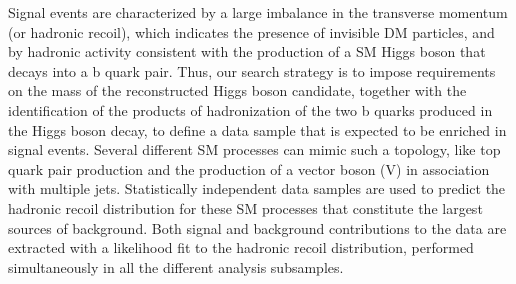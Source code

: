 


Signal events are characterized by a large imbalance in the transverse
momentum (or hadronic recoil), which indicates the presence of invisible
DM particles, and by hadronic activity consistent with the production
of a SM Higgs boson that decays into a b quark pair. Thus, our search
strategy is to impose requirements on the mass of the reconstructed
Higgs boson candidate, together with the identification of the
products of hadronization of the two b quarks produced in the Higgs
boson decay, to define a data sample that is expected to be enriched
in signal events. Several different SM processes can mimic such a topology, like top quark pair production and the production of a vector boson (V) in association with multiple jets. Statistically independent data samples are used to predict the hadronic recoil distribution for these SM processes that constitute the largest sources of background.
Both signal and background contributions to the data are extracted with a likelihood fit to the hadronic recoil distribution, performed simultaneously in all the different analysis subsamples.
